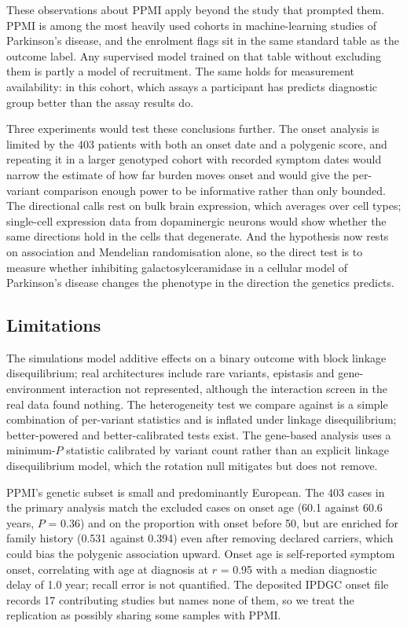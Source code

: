 \documentclass[10pt]{article}
\begin{document}
These observations about PPMI apply beyond the study that prompted them. PPMI is among the most heavily used cohorts in machine-learning studies of Parkinson's disease, and the enrolment flags
sit in the same standard table as the outcome label. Any supervised model trained on that table
without excluding them is partly a model of recruitment. The same holds for measurement
availability: in this cohort, which assays a participant has predicts diagnostic group better than
the assay results do.

Three experiments would test these conclusions further. The onset analysis is
limited by the 403 patients with both an onset date and a polygenic score, and
repeating it in a larger genotyped cohort with recorded symptom dates would
narrow the estimate of how far burden moves onset and would give the per-variant
comparison enough power to be informative rather than only bounded. The
directional calls rest on bulk brain expression, which averages over cell types;
single-cell expression data from dopaminergic neurons would show whether the
same directions hold in the cells that degenerate. And the 
hypothesis now rests on association and Mendelian randomisation alone, so the
direct test is to measure whether inhibiting galactosylceramidase in a cellular
model of Parkinson's disease changes the phenotype in the direction the genetics
predicts.

\subsection*{Limitations}

The simulations model additive effects on a binary outcome with block linkage disequilibrium; real
architectures include rare variants, epistasis and gene-environment interaction not represented,
although the interaction screen in the real data found nothing. The heterogeneity test we compare
against is a simple combination of per-variant statistics and is inflated under linkage
disequilibrium; better-powered and better-calibrated tests exist. The gene-based analysis uses a
minimum-$P$ statistic calibrated by variant count rather than an explicit linkage disequilibrium
model, which the rotation null mitigates but does not remove.

PPMI's genetic subset is small and predominantly European. The 403 cases in the primary analysis
match the excluded cases on onset age (60.1 against 60.6 years, $P$ = 0.36) and on the proportion
with onset before 50, but are enriched for family history (0.531 against 0.394) even after
removing declared carriers, which could bias the polygenic association upward. Onset age is
self-reported symptom onset, correlating with age at diagnosis at $r$ = 0.95 with a median
diagnostic delay of 1.0 year; recall error is not quantified. The deposited IPDGC onset file records 17 contributing studies but names none of them, so we treat the replication as possibly sharing some samples with PPMI.
\end{document}
